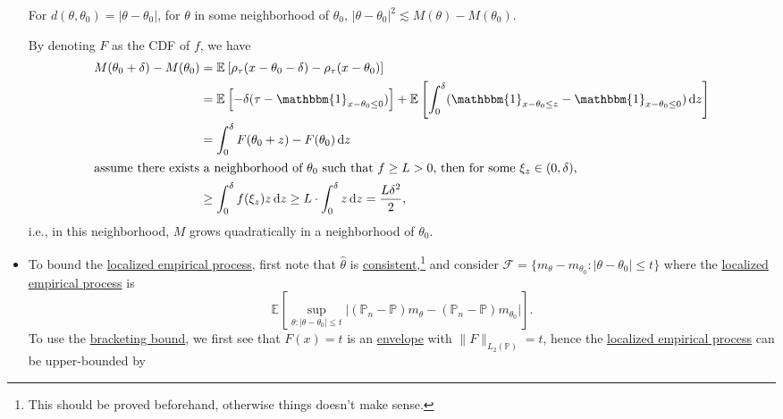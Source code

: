 \begin{explanation}
\begin{itemize}
		      \begin{claim}
			      For \(d(\theta , \theta _0) = \vert \theta - \theta _0 \vert \), for \(\theta \) in some neighborhood of \(\theta _0\), \(\vert \theta - \theta _0 \vert ^2 \lesssim M(\theta ) - M(\theta _0)\).
		      \end{claim}
		      \begin{explanation}
			      By denoting \(F\) as the CDF of \(f\), we have
			      \begin{align*}
				      M(\theta _0 + \delta ) - M(\theta _0)
				       & = \mathbb{E}_{}\left[\rho _\tau (x - \theta _0 - \delta ) - \rho _\tau (x - \theta _0) \right]                                                                                                                              \\
				       & = \mathbb{E}_{}\left[-\delta (\tau - \mathbbm{1}_{x - \theta _0 \leq 0} ) \right] + \mathbb{E}_{}\left[\int_{0}^{\delta } ( \mathbbm{1}_{x - \theta _0 \leq z} - \mathbbm{1}_{x - \theta _0 \leq 0} ) \,\mathrm{d}z \right] \\
				       & = \int_{0}^{\delta } F(\theta _0 + z) - F(\theta _0) \,\mathrm{d}z                                                                                                                                                          \\
				      \shortintertext{assume there exists a neighborhood of \(\theta _0\) such that \(f \geq L > 0\), then for some \(\xi _z \in (0, \delta )\),}
				       & \geq \int_{0}^{\delta } f(\xi _z) z \,\mathrm{d}z
				      \geq L\cdot \int_{0}^{\delta } z \,\mathrm{d}z
				      = \frac{L \delta ^2}{2},
			      \end{align*}
			      i.e., in this neighborhood, \(M\) grows quadratically in a neighborhood of \(\theta _0\).
		      \end{explanation}
		\item To bound the \hyperref[def:localized-EP]{localized empirical process}, first note that \(\hat{\theta} \) is \hyperref[def:consistent]{consistent},\footnote{This should be proved beforehand, otherwise things doesn't make sense.} and consider \(\mathscr{F} = \{ m_\theta - m_{\theta _0} \colon \vert \theta - \theta _0 \vert \leq t \} \) where the \hyperref[def:localized-EP]{localized empirical process} is
		      \[
			      \mathbb{E}_{}\left[\sup _{\theta \colon \vert \theta - \theta _0 \vert \leq t} \vert (\mathbb{P} _n - \mathbb{P} ) m_\theta - (\mathbb{P} _n - \mathbb{P} ) m_{\theta _0} \vert \right].
		      \]
		      To use the \hyperref[thm:bracketing-bound]{bracketing bound}, we first see that \(F(x) = t\) is an \hyperref[def:envelope]{envelope} with \(\lVert F \rVert _{L_2(\mathbb{P} )} = t\), hence the \hyperref[def:localized-EP]{localized empirical process} can be upper-bounded by

\end{itemize}
\end{explanation}
